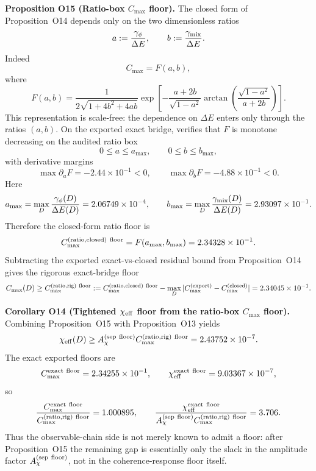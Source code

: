 \documentclass[aps,prd,onecolumn,notitlepage,nofootinbib,superscriptaddress,11pt,floatfix]{revtex4-2}
\begin{document}
\medskip\noindent\textbf{Proposition O15 (Ratio-box \texorpdfstring{$C_{\max}$}{Cmax} floor).}
The closed form of Proposition~O14 depends only on the two dimensionless ratios
\[
a:=\frac{\gamma_\phi}{\Delta E},
\qquad
b:=\frac{\gamma_{\rm mix}}{\Delta E}.
\]
Indeed
\[
C_{\max}=F(a,b),
\]
where
\[
F(a,b)
=
\frac{1}{2\sqrt{1+4b^2+4ab}}
\exp\!\left[
-\frac{a+2b}{\sqrt{1-a^2}}
\arctan\!\left(\frac{\sqrt{1-a^2}}{a+2b}\right)
\right].
\]
This representation is scale-free: the dependence on $\Delta E$ enters only through the ratios $(a,b)$.
On the exported exact bridge,  verifies that $F$ is monotone decreasing on the audited ratio box
\[
0\le a\le a_{\max},
\qquad
0\le b\le b_{\max},
\]
with derivative margins
\[
\max \partial_a F=-2.44\times10^{-1}<0,
\qquad
\max \partial_b F=-4.88\times10^{-1}<0.
\]
Here
\[
a_{\max}=\max_D \frac{\gamma_\phi(D)}{\Delta E(D)}
=2.06749\times10^{-4},
\qquad
b_{\max}=\max_D \frac{\gamma_{\rm mix}(D)}{\Delta E(D)}
=2.93097\times10^{-1}.
\]
Therefore the closed-form ratio floor is
\[
C_{\max}^{\rm(ratio,closed)\ floor}=F(a_{\max},b_{\max})=2.34328\times10^{-1}.
\]
Subtracting the exported exact-vs-closed residual bound from Proposition~O14 gives the rigorous exact-bridge floor
\[
C_{\max}(D)\ge
C_{\max}^{\rm(ratio,rig)\ floor}
:=
C_{\max}^{\rm(ratio,closed)\ floor}
-\max_D |C_{\max}^{\rm(export)}-C_{\max}^{\rm(closed)}|
=2.34045\times10^{-1}.
\]

\medskip\noindent\textbf{Corollary O14 (Tightened \texorpdfstring{$\chi_{\rm eff}$}{chi_eff} floor from the ratio-box \texorpdfstring{$C_{\max}$}{Cmax} floor).}
Combining Proposition~O15 with Proposition~O13 yields
\[
\chi_{\rm eff}(D)
\ge
A_\chi^{\rm(sep\ floor)} C_{\max}^{\rm(ratio,rig)\ floor}
=2.43752\times10^{-7}.
\]
The exact exported floors are
\[
C_{\max}^{\rm exact\ floor}=2.34255\times10^{-1},
\qquad
\chi_{\rm eff}^{\rm exact\ floor}=9.03367\times10^{-7},
\]
so
\[
\frac{C_{\max}^{\rm exact\ floor}}{C_{\max}^{\rm(ratio,rig)\ floor}}=1.000895,
\qquad
\frac{\chi_{\rm eff}^{\rm exact\ floor}}
{A_\chi^{\rm(sep\ floor)} C_{\max}^{\rm(ratio,rig)\ floor}}
=3.706.
\]
Thus the observable-chain side is not merely known to admit a floor: after Proposition~O15 the remaining gap is essentially only the slack in the amplitude factor $A_\chi^{\rm(sep\ floor)}$, not in the coherence-response floor itself.
\end{document}
